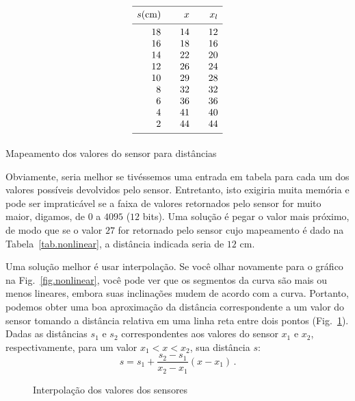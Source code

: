 \begin{table}
\begin{displaymath}
\begin{array}{r@{\hspace{2em}}r@{\hspace{2em}}r}
\hline\noalign{\smallskip}
s \textrm{(cm)} & x & x_l\\
\noalign{\smallskip}\hline\noalign{\smallskip}
18 &14 & 12\\
16 &18 & 16\\
 14&22 & 20\\
 12&26 & 24\\
 10&29 & 28\\
 8 &32 & 32\\
 6 &36 & 36\\
 4 &41 & 40\\
 2 &44 & 44\\
\noalign{\smallskip}\hline\noalign{\smallskip}
\end{array}
\end{displaymath}
\caption{Mapeamento dos valores do sensor para distâncias}\label{tab.nonlinear}
\end{table}
Obviamente, seria melhor se tivéssemos uma entrada em tabela para cada um dos valores possíveis devolvidos pelo sensor. Entretanto, isto exigiria muita memória e pode ser impraticável se a faixa de valores retornados pelo sensor for muito maior, digamos, de $0$ a $4095$ ($12$ bits). Uma solução é pegar o valor mais próximo, de modo que se o valor $27$ for retornado pelo sensor cujo mapeamento é dado na Tabela~\ref{tab.nonlinear}, a distância indicada seria de $12$ cm.

Uma solução melhor é usar interpolação. Se você olhar novamente para o gráfico na Fig.~\ref{fig.nonlinear}, você pode ver que os segmentos da curva são mais ou menos lineares, embora suas inclinações mudem de acordo com a curva. Portanto, podemos obter uma boa aproximação da distância correspondente a um valor do sensor tomando a distância relativa em uma linha reta entre dois pontos (Fig.~\ref{fig.interpolation}). Dadas as distâncias $s_1$ e $s_2$ correspondentes aos valores do sensor $x_1$ e $x_2$, respectivamente, para um valor $x_1<x<x_2$, sua distância $s$:
\[
s = s_1 + \frac{s_2-s_1}{x_2-x_1}(x-x_1)\,.
\]

\begin{figure}
\begin{center}
\caption{Interpolação dos valores dos sensores}\label{fig.interpolation}
\end{center}
\end{figure}

